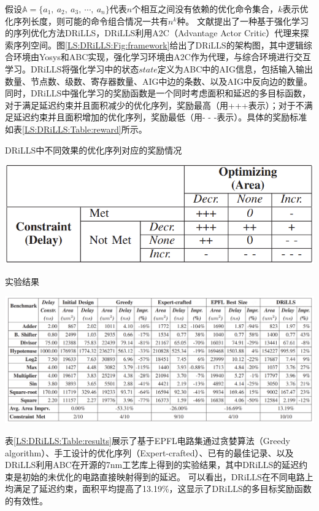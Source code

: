 假设$\mathbb{A} = \{ a_1,\ a_2,\ a_3,\ \cdots,\ a_n \}$代表$n$个相互之间没有依赖的优化命令集合，$k$表示优化序列长度，则可能的命令组合情况一共有$n^k$种。
文献\cite{LS:DRiLLS}提出了一种基于强化学习的序列优化方法DRiLLS，DRiLLS利用A2C（Advantage Actor Critic）代理来探索序列空间。图\ref{LS:DRiLLS:Fig:framework}给出了DRiLLS的架构图，其中逻辑综合环境由Yosys和ABC实现，强化学习环境由A2C作为代理，与综合环境进行交互学习。DRiLLS将强化学习中的状态$state$定义为ABC中的AIG信息，包括输入输出数量、节点数、级数、寄存器数量、AIG中边的条数、以及AIG中反向边的数量。
同时，DRiLLS中强化学习的奖励函数是一个同时考虑面积和延迟的多目标函数，对于满足延迟约束并且面积减少的优化序列，奖励最高（用+++表示）；对于不满足延迟约束并且面积增加的优化序列，奖励最低（用- - -表示）。具体的奖励标准如表\ref{LS:DRiLLS:Table:reward}所示。

\begin{table}[!htbp]
    \caption{DRiLLS中不同效果的优化序列对应的奖励情况}
    \centering
    \label{LS:DRiLLS:Table:reward}
    \includegraphics[width=0.7\linewidth]{./figs/LS-DRiLLS-reward_table.png}
\end{table}

\begin{table}[!htbp]
    \caption{实验结果}
    \centering
    \label{LS:DRiLLS:Table:results}
    \includegraphics[width=\linewidth]{./figs/LS-DRiLLS-results.png}
\end{table}

表\ref{LS:DRiLLS:Table:results}展示了基于EPFL电路集\cite{LS:EPFL_benchs_iwls,LS:EPFL_benchs_github}通过贪婪算法（Greedy algorithm）、手工设计的优化序列\cite{LS:DRiLLS:hand_craft}（Expert-crafted）、已有的最佳记录、以及DRiLLS利用ABC\cite{LS:ABC}在开源的7nm工艺库\cite{ASAP7_github}上得到的实验结果，其中DRiLLS的延迟约束是初始的未优化的电路直接映射得到的延迟。
可以看出，DRiLLS在不同电路上均满足了延迟约束，面积平均提高了13.19\%，这显示了DRiLLS的多目标奖励函数的有效性。


